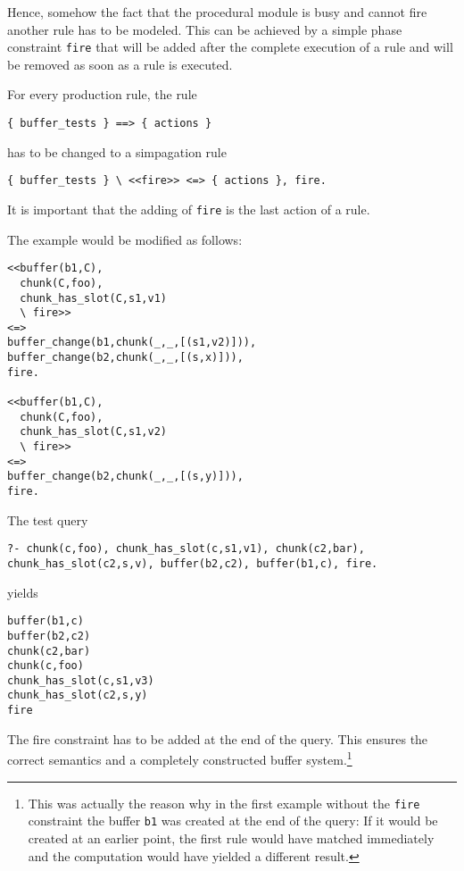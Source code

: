 Hence, somehow the fact that the procedural module is busy and cannot fire another rule has to be modeled. This can be achieved by a simple phase constraint \lstinline|fire| that will be added after the complete execution of a rule and will be removed as soon as a rule is executed.

For every production rule, the rule

\begin{lstlisting}
{ buffer_tests } ==> { actions }
\end{lstlisting}

has to be changed to a simpagation rule

\begin{lstlisting}
{ buffer_tests } \ <<fire>> <=> { actions }, fire.
\end{lstlisting}

It is important that the adding of \lstinline|fire| is the last action of a rule.

The example would be modified as follows:

\begin{lstlisting}
<<buffer(b1,C),
  chunk(C,foo),
  chunk_has_slot(C,s1,v1)
  \ fire>>
<=>
buffer_change(b1,chunk(_,_,[(s1,v2)])),
buffer_change(b2,chunk(_,_,[(s,x)])),
fire.

<<buffer(b1,C),
  chunk(C,foo),
  chunk_has_slot(C,s1,v2)
  \ fire>>
<=>
buffer_change(b2,chunk(_,_,[(s,y)])),
fire.
\end{lstlisting}


The test query

\begin{lstlisting}
?- chunk(c,foo), chunk_has_slot(c,s1,v1), chunk(c2,bar), chunk_has_slot(c2,s,v), buffer(b2,c2), buffer(b1,c), fire.
\end{lstlisting}

yields

\begin{lstlisting}
buffer(b1,c)
buffer(b2,c2)
chunk(c2,bar)
chunk(c,foo)
chunk_has_slot(c,s1,v3)
chunk_has_slot(c2,s,y)
fire
\end{lstlisting}

The fire constraint has to be added at the end of the query. This ensures the correct semantics and a completely constructed buffer system.\footnote{This was actually the reason why in the first example without the \texttt{fire} constraint the buffer \texttt{b1} was created at the end of the query: If it would be created at an earlier point, the first rule would have matched immediately and the computation would have yielded a different result.}

